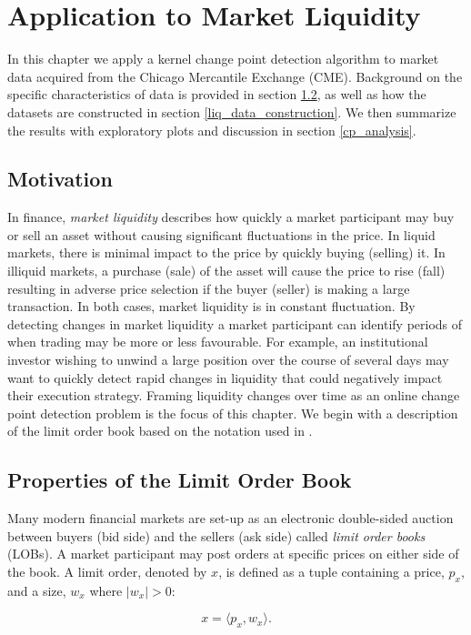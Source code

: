\chapter{Application to Market Liquidity}
In this chapter we apply a kernel change point detection algorithm to market data acquired from the Chicago Mercantile Exchange (CME). Background on the specific characteristics of data is provided in section \ref{prop_book}, as well as how the datasets are constructed in section \ref{liq_data_construction}. We then summarize the results with exploratory plots and discussion in section \ref{cp_analysis}.

\section{Motivation}
In finance, \textit{market liquidity} describes how quickly a market participant may buy or sell an asset without causing significant fluctuations in the price. In liquid markets, there is minimal impact to the price by quickly buying (selling) it. In illiquid markets, a purchase (sale) of the asset will cause the price to rise (fall) resulting in adverse price selection if the buyer (seller) is making a large transaction. In both cases, market liquidity is in constant fluctuation. By detecting changes in market liquidity a market participant can identify periods of when trading may be more or less favourable. For example, an institutional investor wishing to unwind a large position over the course of several days may want to quickly detect rapid changes in liquidity that could negatively impact their execution strategy. Framing liquidity changes over time as an online change point detection problem is the focus of this chapter. We begin with a description of the limit order book based on the notation used in \cite{gould2016queue}. 

\section{Properties of the Limit Order Book}
\label{prop_book}
Many modern financial markets are set-up as an electronic double-sided auction between buyers (bid side) and the sellers (ask side) called \textit{limit order books} (LOBs). A market participant may post orders at specific prices on either side of the book. A limit order, denoted by $x$, is defined as a tuple containing a price, $p_x$, and a size, $w_x$ where $|w_x|>0$:

\begin{equation}
x = \langle p_x, w_x \rangle.
\end{equation}

